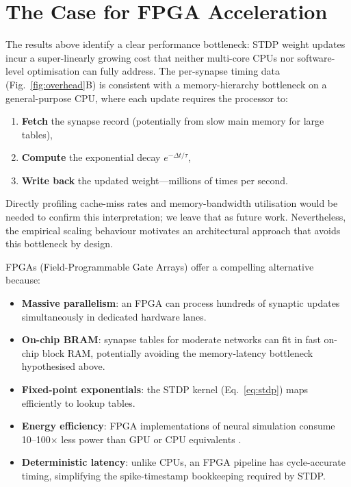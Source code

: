 \documentclass[10pt,twocolumn]{article}
\begin{document}
\section{The Case for FPGA Acceleration}
\label{sec:fpga}

The results above identify a clear performance bottleneck:
STDP weight updates incur a super-linearly growing cost that
neither multi-core CPUs nor software-level optimisation can
fully address.
The per-synapse timing data (Fig.~\ref{fig:overhead}B) is
consistent with a memory-hierarchy bottleneck on a general-purpose
CPU, where each update requires the processor to:

\begin{enumerate}\setlength\itemsep{0pt}
  \item \textbf{Fetch} the synapse record (potentially from slow
        main memory for large tables),
  \item \textbf{Compute} the exponential decay $e^{-\Delta t/\tau}$,
  \item \textbf{Write back} the updated weight—millions of times
        per second.
\end{enumerate}

Directly profiling cache-miss rates and memory-bandwidth utilisation
would be needed to confirm this interpretation; we leave that as
future work.
Nevertheless, the empirical scaling behaviour motivates an
architectural approach that avoids this bottleneck by design.

FPGAs (Field-Programmable Gate Arrays) offer a compelling
alternative because:
\begin{itemize}\setlength\itemsep{0pt}
  \item \textbf{Massive parallelism}: an FPGA can process hundreds of
        synaptic updates simultaneously in dedicated hardware lanes.
  \item \textbf{On-chip BRAM}: synapse tables for moderate networks
        can fit in fast on-chip block RAM, potentially avoiding the
        memory-latency bottleneck hypothesised above.
  \item \textbf{Fixed-point exponentials}: the STDP kernel
        (Eq.~\ref{eq:stdp}) maps efficiently to lookup tables.
  \item \textbf{Energy efficiency}: FPGA implementations of neural
        simulation consume 10–100$\times$ less power than GPU or CPU
        equivalents \cite{cheung2012,han2020}.
  \item \textbf{Deterministic latency}: unlike CPUs, an FPGA pipeline
        has cycle-accurate timing, simplifying the spike-timestamp
        bookkeeping required by STDP.
\end{itemize}
\end{document}
